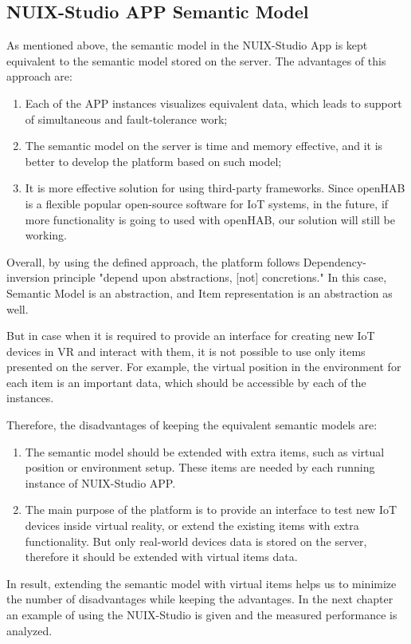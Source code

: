 \subsection{NUIX-Studio APP Semantic Model}

As mentioned above, the semantic model in the NUIX-Studio App is kept equivalent to the semantic model stored on the server. The advantages of this approach are:

\begin{enumerate}
    \item Each of the APP instances visualizes equivalent data, which leads to support of simultaneous and fault-tolerance work;
    \item The semantic model on the server is time and memory effective, and it is better to develop the platform based on such model;
    \item It is more effective solution for using third-party frameworks. Since openHAB is a flexible popular open-source software for IoT systems, in the future, if more functionality is going to used with openHAB, our solution will still be working.
\end{enumerate}

Overall, by using the defined approach, the platform follows Dependency-inversion principle "depend upon abstractions, [not] concretions." In this case, Semantic Model is an abstraction, and Item representation is an abstraction as well.

But in case when it is required to provide an interface for creating new IoT devices in VR and interact with them, it is not possible to use only items presented on the server. For example, the virtual position in the environment for each item is an important data, which should be accessible by each of the instances.

Therefore, the disadvantages of keeping the equivalent semantic models are:

\begin{enumerate}
    \item The semantic model should be extended with extra items, such as virtual position or environment setup. These items are needed by each running instance of NUIX-Studio APP.
    \item The main purpose of the platform is to provide an interface to test new IoT devices inside virtual reality, or extend the existing items with extra functionality. But only real-world devices data is stored on the server, therefore it should be extended with virtual items data.
\end{enumerate}

In result, extending the semantic model with virtual items helps us to minimize the number of disadvantages while keeping the advantages.
In the next chapter an example of using the NUIX-Studio is given and the measured performance is analyzed.